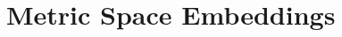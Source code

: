 \chapter{Metric Space Embeddings}
\begin{refsection}
%
\printbibliography[heading=subbibliography]
\end{refsection}